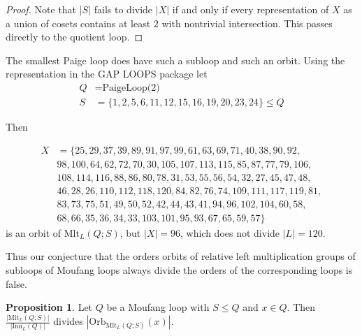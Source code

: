 \documentclass[12pt, twoside, openright]{report}
\theoremstyle{definition}
\newtheorem{prp}[thm]{Proposition}
\newcommand{\mlt}{\text{Mlt}}       %
\newcommand{\inn}{\text{Inn}}       %
\newcommand{\orb}{\text{Orb}}		    %
\begin{document}
\begin{proof}
  Note that $|S|$ fails to divide $|X|$ if and only if every representation of $X$ as a union of cosets contains
    at least $2$ with nontrivial intersection. This passes directly to the quotient loop.
\end{proof}

The smallest Paige loop does have such a subloop and such an orbit. Using the representation in the
  GAP LOOPS package let
\begin{align*}
  Q &= \text{PaigeLoop(2)}\\
  S &= \{1, 2, 5, 6, 11, 12, 15, 16, 19, 20, 23, 24\} \leq Q
\end{align*}

Then

\begin{align*}
X &= \{25, 29, 37, 39, 89, 91, 97, 99, 61, 63, 69, 71, 40, 38, 90, 92,\\
  &98, 100, 64, 62, 72, 70, 30, 105, 107, 113, 115, 85, 87, 77, 79, 106,\\
  &108, 114, 116, 88, 86, 80, 78, 31, 53, 55, 56, 54, 32, 27, 45, 47, 48,\\
  &46, 28, 26, 110, 112, 118, 120, 84, 82, 76, 74, 109, 111, 117, 119, 81,\\
  &83, 73, 75, 51, 49, 50, 52, 42, 44, 43, 41, 94, 96, 102, 104, 60, 58,\\
  &68, 66, 35, 36, 34, 33, 103, 101, 95, 93, 67, 65, 59, 57\}
\end{align*}
is an orbit of $\mlt_L(Q; S)$, but $|X| = 96$, which does not divide $|L| = 120$.

Thus our conjecture that the orders orbits of relative left multiplication groups of subloops of Moufang loops always
  divide the orders of the corresponding loops is false. 

\begin{prp}
 Let $Q$ be a Moufang loop with $S\leq Q$ and $x\in Q$. Then $\frac{|\mlt_L(Q;S)|}{|\inn_L(Q)|}$
  divides $|\orb_{\mlt_L(Q;S)}(x)|$.
\end{prp}
\end{document}
